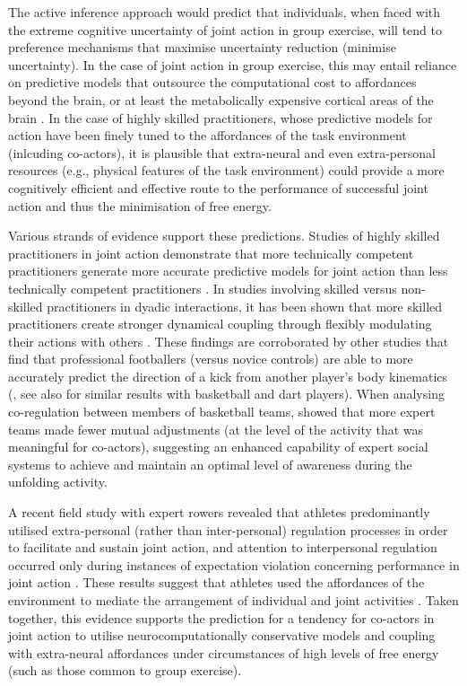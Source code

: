 \begin{CJK}{UTF8}{gbsn}
The active inference approach would predict that individuals, when faced with the extreme cognitive uncertainty of joint action in group exercise, will tend to preference mechanisms that maximise uncertainty reduction (minimise uncertainty).  In the case of joint action in group exercise, this may entail reliance on predictive models that outsource the computational cost to affordances beyond the brain, or at least the metabolically expensive cortical areas of the brain \citep{Dietrich2004,Clark2015}.  In the case of highly skilled practitioners, whose predictive models for action have been finely tuned to the affordances of the task environment (inlcuding co-actors), it is plausible that extra-neural and even extra-personal resources (e.g., physical features of the task environment) could provide a more cognitively efficient and effective route to the performance of successful joint action and thus the minimisation of free energy.

Various strands of evidence support these predictions.  Studies of highly skilled practitioners in joint action demonstrate that more technically competent practitioners generate more accurate predictive models for joint action than less technically competent practitioners \citep{Tomeo2012,Aglioti2008,Mulligan2016}.   In studies involving skilled versus non-skilled practitioners in dyadic interactions, it has been shown that more skilled practitioners create stronger dynamical coupling through flexibly modulating their actions with others \citep{Schmidt2011,Caron2017}. These findings are corroborated by other studies that find that professional footballers (versus novice controls) are able to more accurately predict the direction of a kick from another player's body kinematics (\cite{Tomeo2012}, see also \cite{Aglioti2008,Mulligan2016} for similar results with basketball and dart players).  When analysing co-regulation between members of basketball teams, \textcite{Bourbousson2015} showed that more expert teams made fewer mutual adjustments (at the level of the activity that was meaningful for co-actors), suggesting an enhanced capability of expert social systems to achieve and maintain an optimal level of awareness during the unfolding activity.

A recent field study with expert rowers revealed that athletes predominantly utilised
extra-personal (rather than inter-personal) regulation processes in order to facilitate and sustain joint action, and attention to interpersonal regulation occurred only during instances of expectation violation concerning performance in joint action \citep[; for a full explanation of this study, see Appendix ~\ref{app2:theory} Section ~\ref{sect:rowerStudy}]{RKiouak2016}. These results suggest that athletes used the affordances of the environment to mediate the arrangement of individual and joint activities \citep{Bourbousson2011,Bourbousson2012}.  Taken together, this evidence supports the prediction for a tendency for co-actors in joint action to utilise neurocomputationally conservative models and coupling with extra-neural affordances under circumstances of high levels of free energy (such as those common to group exercise).



\end{CJK}
